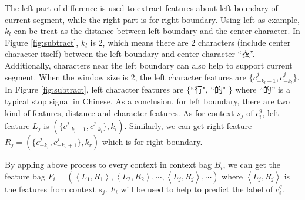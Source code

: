 The left part of difference is used to extract features about left boundary of current segment, while the right part is for right boundary. Using left as example, $k_l$ can be treat as the distance between left boundary and the center character. In Figure \ref{fig:subtract}, $k_l$ is 2, which means there are $2$ characters (include center character itself) between the left boundary and center character ``衣''. Additionally, characters near the left boundary can also help to support current segment. When the window size is $2$, the left character features are $\{c_{-k_l-1}^j, c_{-k_l}^j \}$. In Figure \ref{fig:subtract}, left character features are $\{$``行", ``的" $\}$ where ``的'' is a typical stop signal in Chinese. As a conclusion, for left boundary, there are two kind of features, distance and character features. As for context $s_j$ of $c_i^q$, left feature $L_j$ is $(\{ c_{-k_l-1}^j, c_{-k_l}^j \}, k_l)$. Similarly, we can get right feature $R_j=(\{ c_{+k_r}^j, c_{+k_r+1}^j \}, k_r)$ which is for right boundary.

By appling above process to every context in context bag $B_i$, we can get the feature bag $F_i = (\left \langle L_1, R_1 \right \rangle, \left \langle L_2, R_2 \right \rangle, \cdots, \left \langle L_j, R_j \right \rangle, \cdots)$ where $\left \langle L_j, R_j \right \rangle$ is the features from context $s_j$. $F_i$ will be used to help to predict the label of $c_i^q$.

